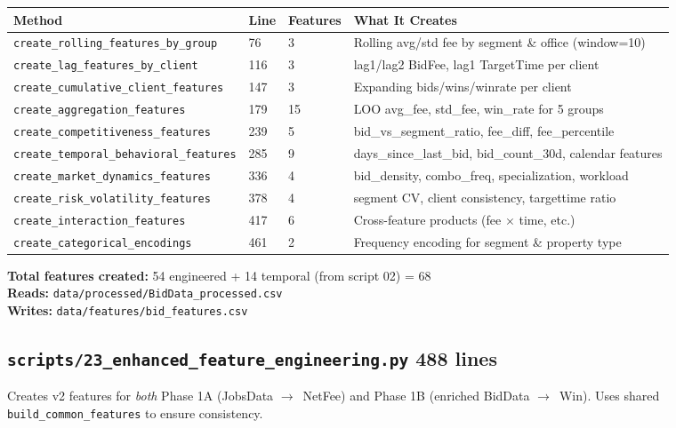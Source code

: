 \documentclass[11pt,a4paper]{article}
\newcommand{\file}[1]{\texttt{\color{gssblue!70!black}#1}}
\newcommand{\func}[1]{\texttt{\color{gssgreen!80!black}#1}}
\newcommand{\arrow}{$\rightarrow$}
\newcommand{\pipetag}[1]{\colorbox{pipeblue!15}{\small\textcolor{pipeblue}{\textbf{#1}}}}
\begin{document}
\begin{longtable}{l l l p{5.5cm}}
\toprule
\textbf{Method} & \textbf{Line} & \textbf{Features} & \textbf{What It Creates} \\
\midrule
\endhead
\func{create\_rolling\_features\_by\_group} & 76 & 3 & Rolling avg/std fee by segment \& office (window=10) \\
\func{create\_lag\_features\_by\_client} & 116 & 3 & lag1/lag2 BidFee, lag1 TargetTime per client \\
\func{create\_cumulative\_client\_features} & 147 & 3 & Expanding bids/wins/winrate per client \\
\func{create\_aggregation\_features} & 179 & 15 & LOO avg\_fee, std\_fee, win\_rate for 5 groups \\
\func{create\_competitiveness\_features} & 239 & 5 & bid\_vs\_segment\_ratio, fee\_diff, fee\_percentile \\
\func{create\_temporal\_behavioral\_features} & 285 & 9 & days\_since\_last\_bid, bid\_count\_30d, calendar features \\
\func{create\_market\_dynamics\_features} & 336 & 4 & bid\_density, combo\_freq, specialization, workload \\
\func{create\_risk\_volatility\_features} & 378 & 4 & segment CV, client consistency, targettime ratio \\
\func{create\_interaction\_features} & 417 & 6 & Cross-feature products (fee $\times$ time, etc.) \\
\func{create\_categorical\_encodings} & 461 & 2 & Frequency encoding for segment \& property type \\
\bottomrule
\end{longtable}

\textbf{Total features created:} 54 engineered + 14 temporal (from script 02) = 68\\
\textbf{Reads:} \file{data/processed/BidData\_processed.csv}\\
\textbf{Writes:} \file{data/features/bid\_features.csv}

\subsection{\file{scripts/23\_enhanced\_feature\_engineering.py} \pipetag{488 lines}}

Creates v2 features for \emph{both} Phase 1A (JobsData \arrow\ NetFee) and Phase 1B
(enriched BidData \arrow\ Win). Uses shared \func{build\_common\_features} to ensure
consistency.
\end{document}
